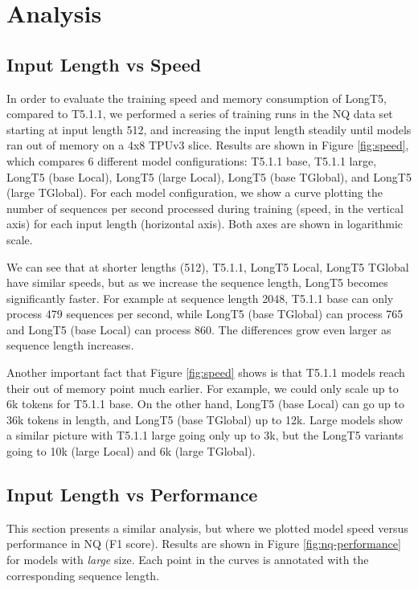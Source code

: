 \section{Analysis}\label{sec:analysis}

\subsection{Input Length vs Speed}\label{subsec:analysis:speed}

In order to evaluate the training speed and memory consumption of LongT5, compared to T5.1.1, we performed a series of training runs in the NQ data set starting at input length 512, and increasing the input length steadily until models ran out of memory on a 4x8 TPUv3 slice. Results are shown in Figure \ref{fig:speed}, which compares 6 different model configurations: T5.1.1 base, T5.1.1 large, LongT5 (base Local), LongT5 (large Local), LongT5 (base TGlobal), and LongT5 (large TGlobal). For each model configuration, we show a curve plotting the number of sequences per second processed during training (speed, in the vertical axis) for each input length (horizontal axis). Both axes are shown in logarithmic scale.

We can see that at shorter lengths (512), T5.1.1, LongT5 Local, LongT5 TGlobal have similar speeds, but as we increase the sequence length, LongT5 becomes significantly faster. For example at sequence length 2048, T5.1.1 base can only process 479 sequences per second, while LongT5 (base TGlobal) can process 765 and LongT5 (base Local) can process 860. The differences grow even larger as sequence length increases.

Another important fact that Figure \ref{fig:speed} shows is that T5.1.1 models reach their out of memory point much earlier. For example, we could only scale up to 6k tokens for T5.1.1 base. On the other hand, LongT5 (base Local) can go up to 36k tokens in length, and LongT5 (base TGlobal) up to 12k. Large models show a similar picture with T5.1.1 large going only up to 3k, but the LongT5 variants going to 10k (large Local) and 6k (large TGlobal).

\subsection{Input Length vs Performance} \label{subsec:analysis:performance}

This section presents a similar analysis, but where we plotted model speed versus performance in NQ (F1 score). Results are shown in Figure \ref{fig:nq-performance} for models with {\em large} size. Each point in the curves is annotated with the corresponding sequence length. 

